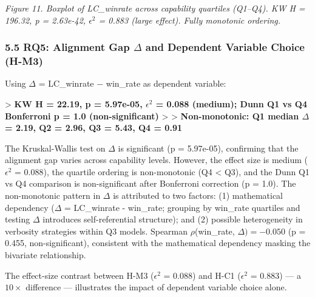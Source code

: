 \textit{Figure 11. Boxplot of LC\_winrate across capability quartiles (Q1--Q4). KW H = 196.32, p = 2.63e-42, $\epsilon ^2$ = 0.883 (large effect). Fully monotonic ordering.}

\subsubsection{5.5 RQ5: Alignment Gap $\Delta$ and Dependent Variable Choice (H-M3)}

Using $\Delta$ = LC\_winrate $-$ win\_rate as dependent variable:

> \textbf{KW H = 22.19, p = 5.97e-05, $\epsilon ^2$ = 0.088 (medium); Dunn Q1 vs Q4 Bonferroni p = 1.0 (non-significant)}
>
> \textbf{Non-monotonic: Q1 median $\Delta$ = 2.19, Q2 = 2.96, Q3 = 5.43, Q4 = 0.91}

The Kruskal-Wallis test on $\Delta$ is significant (p = 5.97e-05), confirming that the alignment gap varies across capability levels. However, the effect size is medium ($\epsilon ^2$ = 0.088), the quartile ordering is non-monotonic (Q4 < Q3), and the Dunn Q1 vs Q4 comparison is non-significant after Bonferroni correction (p = 1.0). The non-monotonic pattern in $\Delta$ is attributed to two factors: (1) mathematical dependency ($\Delta$ = LC\_winrate - win\_rate; grouping by win\_rate quartiles and testing $\Delta$ introduces self-referential structure); and (2) possible heterogeneity in verbosity strategies within Q3 models. Spearman $\rho$(win\_rate, $\Delta ) = -0.050$ (p = 0.455, non-significant), consistent with the mathematical dependency masking the bivariate relationship.

The effect-size contrast between H-M3 ($\epsilon ^2$ = 0.088) and H-C1 ($\epsilon ^2$ = 0.883) --- a $10\times$ difference --- illustrates the impact of dependent variable choice alone.

\begin{table}[htbp]
\centering
{}
\end{table}

